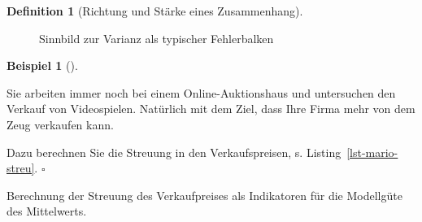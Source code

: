 \documentclass[
  a4paper,
  DIV=11]{scrreprt}
\newenvironment{Shaded}{\begin{snugshade}}{\end{snugshade}}
\newcommand{\CommentTok}[1]{\textcolor[rgb]{0.37,0.37,0.37}{#1}}
\newcommand{\DecValTok}[1]{\textcolor[rgb]{0.68,0.00,0.00}{#1}}
\newcommand{\FunctionTok}[1]{\textcolor[rgb]{0.28,0.35,0.67}{#1}}
\newcommand{\NormalTok}[1]{\textcolor[rgb]{0.00,0.23,0.31}{#1}}
\newcommand{\OtherTok}[1]{\textcolor[rgb]{0.00,0.23,0.31}{#1}}
\newcommand{\SpecialCharTok}[1]{\textcolor[rgb]{0.37,0.37,0.37}{#1}}
\theoremstyle{definition}
\theoremstyle{definition}
\newtheorem{example}{Beispiel}[chapter]
\theoremstyle{definition}
\newtheorem{definition}{Definition}[chapter]
\theoremstyle{remark}
\begin{document}
\begin{definition}[Richtung und Stärke eines
Zusammenhang]
\begin{figure}
\begin{minipage}{0.50\linewidth}


\end{minipage}%

\caption{\label{fig-mse}Sinnbild zur Varianz als typischer Fehlerbalken}

\end{figure}%

\begin{example}[]\protect\hypertarget{exm-var}{}\label{exm-var}

Sie arbeiten immer noch bei einem Online-Auktionshaus und untersuchen
den Verkauf von Videospielen. Natürlich mit dem Ziel, dass Ihre Firma
mehr von dem Zeug verkaufen kann.

Dazu berechnen Sie die Streuung in den Verkaufspreisen, s.
Listing~\ref{lst-mario-streu}. \(\square\)

\end{example}

\begin{codelisting}

\caption{\label{lst-mario-streu}Berechnung der Streuung des
Verkaufpreises als Indikatoren für die Modellgüte des Mittelwerts.}

\centering{

\begin{Shaded}
\begin{Highlighting}[]
\NormalTok{mariokart\_no\_extreme }\OtherTok{\textless{}{-}}
\NormalTok{  mariokart }\SpecialCharTok{\%\textgreater{}\%}
  \FunctionTok{filter}\NormalTok{(total\_pr }\SpecialCharTok{\textless{}} \DecValTok{100}\NormalTok{)  }\CommentTok{\# ohne Extremwerte}


\end{Highlighting}
\end{Shaded}}
\end{codelisting}
\end{definition}
\end{document}
